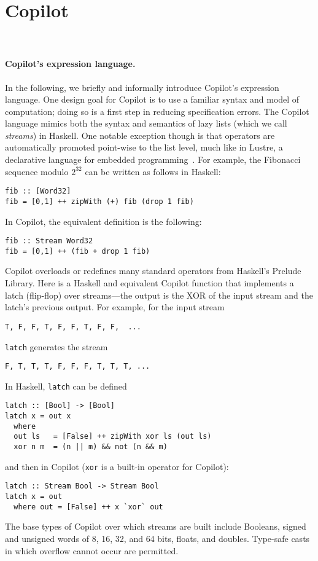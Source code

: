\section{Copilot}~\label{sec:co-intro} 


\paragraph{Copilot's expression language.}
In the following, we briefly and informally introduce Copilot's expression
language.  One design goal for Copilot is to use a familiar syntax and model of
computation; doing so is a first step in reducing specification errors.  The
Copilot language mimics both the syntax and semantics of lazy lists (which we
call \emph{streams}) in Haskell.  One notable exception though is that
operators are automatically promoted point-wise to the list level, much like in
Lustre, a declarative language for embedded programming~\cite{lustre}.  For
example, the Fibonacci sequence modulo $2^{32}$ can be written as follows in Haskell:
%
\begin{lstlisting}[frame=single]
fib :: [Word32]
fib = [0,1] ++ zipWith (+) fib (drop 1 fib)
\end{lstlisting}
%
In Copilot, the equivalent definition is the following:
\begin{lstlisting}[frame=single]
fib :: Stream Word32
fib = [0,1] ++ (fib + drop 1 fib)
\end{lstlisting}
%
Copilot overloads or redefines many standard operators from Haskell's Prelude
Library.  Here is a Haskell and equivalent Copilot function that implements a
latch (flip-flop) over streams---the output is the XOR of the input stream and
the latch's previous output.  For example, for the input stream
%
\begin{lstlisting}
T, F, F, T, F, F, T, F, F,  ...
\end{lstlisting}
%
{\tt latch} generates the stream
\begin{lstlisting}
F, T, T, T, F, F, F, T, T, T, ...
\end{lstlisting}
%
In Haskell, {\tt latch} can be defined
\begin{lstlisting}[frame=single]
latch :: [Bool] -> [Bool]
latch x = out x
  where
  out ls   = [False] ++ zipWith xor ls (out ls)
  xor n m  = (n || m) && not (n && m)
\end{lstlisting}
%
and then in Copilot ({\tt xor} is a built-in operator for Copilot):
%
\begin{lstlisting}[frame=single]
latch :: Stream Bool -> Stream Bool
latch x = out
  where out = [False] ++ x `xor` out
\end{lstlisting}
%
The base types of Copilot over which streams are built include Booleans, signed
and unsigned words of 8, 16, 32, and 64 bits, floats, and doubles. Type-safe
casts in which overflow cannot occur are permitted.

